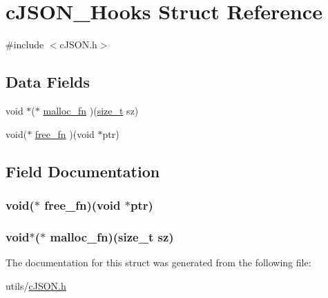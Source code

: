 \hypertarget{structc_j_s_o_n___hooks}{\section{c\-J\-S\-O\-N\-\_\-\-Hooks Struct Reference}
\label{structc_j_s_o_n___hooks}
}


{\ttfamily \#include $<$c\-J\-S\-O\-N.\-h$>$}

\subsection*{Data Fields}
\begin{DoxyCompactItemize}
\item 
void $\ast$($\ast$ \hyperlink{structc_j_s_o_n___hooks_a6e14aa8df61c7a672fe0c79d655adc70}{malloc\-\_\-fn} )(\hyperlink{c_j_s_o_n_8h_aad0f8411dfc957b4069125f330192f4f}{size\-\_\-t} sz)
\item 
void($\ast$ \hyperlink{structc_j_s_o_n___hooks_ab06271bcf01250a9753f9a73584c4841}{free\-\_\-fn} )(void $\ast$ptr)
\end{DoxyCompactItemize}


\subsection{Field Documentation}
\hypertarget{structc_j_s_o_n___hooks_ab06271bcf01250a9753f9a73584c4841}{
\subsubsection[{free\-\_\-fn}]{\setlength{\rightskip}{0pt plus 5cm}void($\ast$ free\-\_\-fn)(void $\ast$ptr)}}\label{structc_j_s_o_n___hooks_ab06271bcf01250a9753f9a73584c4841}
\hypertarget{structc_j_s_o_n___hooks_a6e14aa8df61c7a672fe0c79d655adc70}{
\subsubsection[{malloc\-\_\-fn}]{\setlength{\rightskip}{0pt plus 5cm}void$\ast$($\ast$ malloc\-\_\-fn)({\bf size\-\_\-t} sz)}}\label{structc_j_s_o_n___hooks_a6e14aa8df61c7a672fe0c79d655adc70}


The documentation for this struct was generated from the following file\-:\begin{DoxyCompactItemize}
\item 
utils/\hyperlink{c_j_s_o_n_8h}{c\-J\-S\-O\-N.\-h}\end{DoxyCompactItemize}
